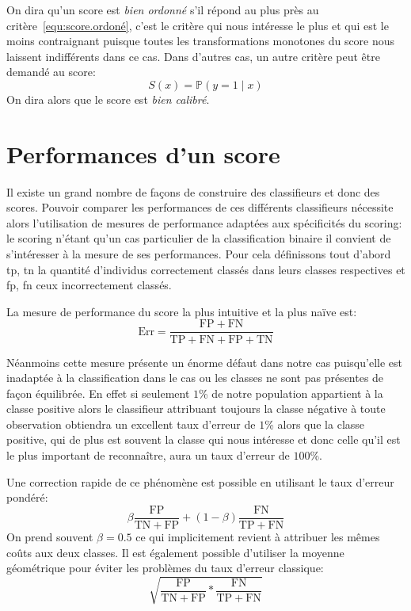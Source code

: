 On dira qu'un score est \emph{bien ordonné} s’il répond au plus près au critère~\ref{equ:score.ordoné}, c'est le critère qui nous intéresse le plus et qui est le moins contraignant puisque toutes les transformations monotones du score nous laissent indifférents dans ce cas. Dans d'autres cas, un autre critère peut être demandé au score:
\begin{equation*}
    S(x) = \mathbb{P} \left( y = 1 \mid x \right)
    \label{equ:score.calibré}
\end{equation*}
On dira alors que le score est \emph{bien calibré}.

\section{Performances d'un score}

Il existe un grand nombre de façons de construire des classifieurs et donc des scores. Pouvoir comparer les performances de ces différents classifieurs nécessite alors l'utilisation de mesures de performance adaptées aux spécificités du scoring: le scoring n'étant qu'un cas particulier de la classification binaire il convient de s'intéresser à la mesure de ses performances. Pour cela définissons tout d'abord \ac{tp}, \ac{tn} la quantité d'individus correctement classés dans leurs classes respectives et \ac{fp}, \ac{fn} ceux incorrectement classés.

La mesure de performance du score la plus intuitive et la plus naïve est:
\begin{equation*}
    \mathrm{Err} = \frac{\mathrm{FP}+\mathrm{FN}}{\mathrm{TP}+\mathrm{FN}+\mathrm{FP}+\mathrm{TN}}
\end{equation*}

Néanmoins cette mesure présente un énorme défaut dans notre cas puisqu'elle est inadaptée à la classification dans le cas ou les classes ne sont pas présentes de façon équilibrée. En effet si seulement $1$\% de notre population appartient à la classe positive alors le classifieur attribuant toujours la classe négative à toute observation obtiendra un excellent taux d'erreur de $1$\% alors que la classe positive, qui de plus est souvent la classe qui nous intéresse et donc celle qu'il est le plus important de reconnaître, aura un taux d'erreur de $100$\%.

Une correction rapide de ce phénomène est possible en utilisant le taux d'erreur pondéré:
\begin{equation*}
    \beta \frac{\mathrm{FP}}{\mathrm{TN}+\mathrm{FP}} + (1-\beta) \frac{\mathrm{FN}}{\mathrm{TP}+\mathrm{FN}}
\end{equation*}
On prend souvent $\beta = 0.5$ ce qui implicitement revient à attribuer les mêmes coûts aux deux classes.
Il est également possible d'utiliser la moyenne géométrique pour éviter les problèmes du taux d'erreur classique:
\begin{equation*}
    \sqrt{\frac{\mathrm{FP}}{\mathrm{TN}+\mathrm{FP}} * \frac{\mathrm{FN}}{\mathrm{TP}+\mathrm{FN}}}
\end{equation*}

